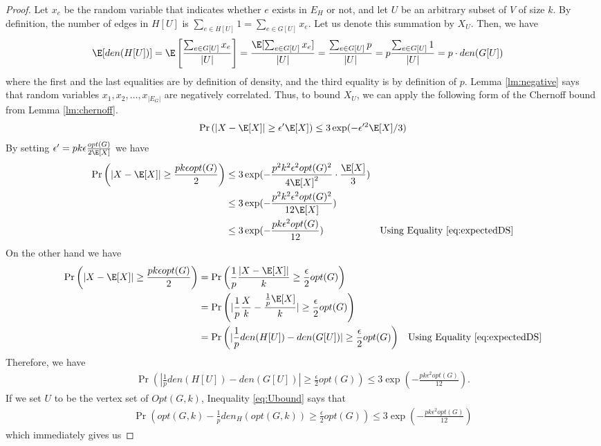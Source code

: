 \begin{proof}
	Let $x_e$ be the random variable that indicates whether $e$ exists in $E_H$ or not, and
	let $U$ be an arbitrary subset of $V$ of size $k$. By definition, the number of edges in $H[U]$ is $\sum_{e \in H[U]} 1 = \sum_{e \in G[U]} x_e$. Let us denote this summation by $X_U$. Then, we have
	\begin{align}\label{eq:expectedDS}
		\E[den(H[U])] &= \E \left[ \frac {\sum_{e \in G[U]} x_e}{|U|} \right ] 
		= \frac {\E[\sum_{e \in G[U]} x_e]}{|U|}  
		=  \frac {\sum_{e \in G[U]} p}{|U|}  
		= p \frac {\sum_{e \in G[U]} 1}{|U|} 
		= p\cdot den(G[U])
	\end{align}
	where the first and the last equalities are by definition of density, and the third equality is by definition of $p$.
	Lemma \ref{lm:negative} says that random variables $x_1,x_2,\dots,x_{|E_G|}$ are negatively correlated. Thus, to bound $X_U$, we can apply the following form of the Chernoff bound from Lemma \ref{lm:chernoff}.
	\begin{align*}
		\Pr\left(|X-\E[X]| \geq \epsilon' \E[X] \right) 
		\leq 3 \exp(-\epsilon'^2\E[X]/3)
	\end{align*}
	By setting $\epsilon'=p k \epsilon \frac{ opt(G)} {2 \E[X]}$ we have
\begin{align*}
		\Pr\left(|X-\E[X]| \geq \frac {p k \epsilon  opt(G)}{2} \right) 
		&\leq 3 \exp(-\frac{p^2 k^2 \epsilon^2  opt(G)^2} {4\E[X]^2} \cdot \frac{\E[X]}{3}) \\
		&\leq 3 \exp(-\frac{p^2 k^2 \epsilon^2  opt(G)^2} {12\E[X]} ) \\
		&\leq 3 \exp(-\frac{p k \epsilon^2  opt(G)} {12} ) &\text{Using Equality \ref{eq:expectedDS}}\\
	\end{align*}
On the other hand we have
	\begin{align*}
		\Pr\left(|X-\E[X]| \geq \frac{p k \epsilon  opt(G)}{2} \right) &=
		\Pr\left(\frac 1 p \frac {|X-\E[X]|}{k} \geq   \frac{\epsilon}{2}  opt(G) \right)\\ 
		&= \Pr\left(|\frac 1 p \frac {X}{k} -  \frac {\frac 1 p \E[X]}{k}| \geq   \frac{\epsilon}{2}  opt(G) \right) \\
		&= \Pr\left(|\frac 1 p den(H[U]) -  den(G[U])| \geq   \frac{\epsilon}{2}  opt(G) \right) &\text{Using Equality \ref{eq:expectedDS}}\\
	\end{align*}
Therefore, we have
	\begin{align} \label{eq:Ubound}
		\Pr\left(|\frac 1 p den(H[U]) -  den(G[U])| \geq   \frac{\epsilon}{2}  opt(G) \right) \leq 3 \exp(-\frac{p k \epsilon^2  opt(G)} {12} ).
	\end{align}
If we set $U$ to be the vertex set of $Opt(G,k)$, Inequality \ref{eq:Ubound} says that 
	\begin{align*}
		\Pr\left(  opt(G,k) - \frac 1 p den_H(opt(G,k))  \geq \frac{\epsilon}{2}   opt(G)\right) \leq 3 \exp(-\frac{p k \epsilon^2  opt(G)} {12} )
	\end{align*}
	which immediately gives us
	

\end{proof}
